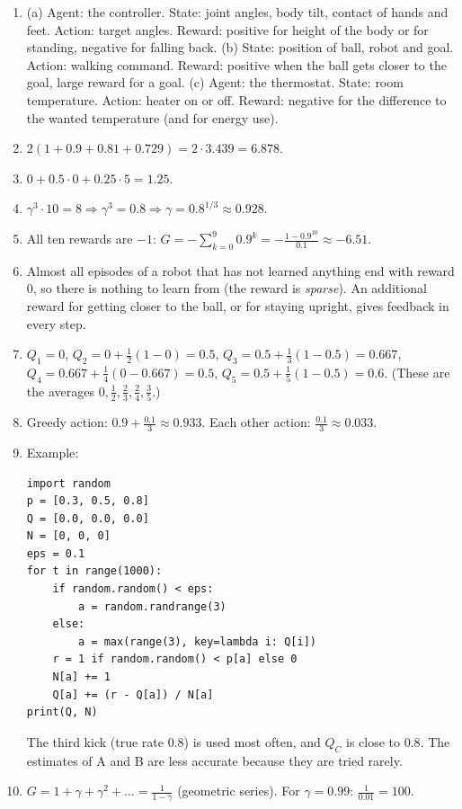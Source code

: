 \begin{enumerate}[label=\textbf{\ansnum.\arabic*}]
  \item (a) Agent: the controller. State: joint angles, body tilt, contact of hands and feet. Action: target angles. Reward: positive for height of the body or for standing, negative for falling back. (b) State: position of ball, robot and goal. Action: walking command. Reward: positive when the ball gets closer to the goal, large reward for a goal. (c) Agent: the thermostat. State: room temperature. Action: heater on or off. Reward: negative for the difference to the wanted temperature (and for energy use).
  \item $2(1+0.9+0.81+0.729)=2\cdot3.439=6.878$.
  \item $0+0.5\cdot0+0.25\cdot5=1.25$.
  \item $\gamma^3\cdot10=8\Rightarrow\gamma^3=0.8\Rightarrow\gamma=0.8^{1/3}\approx0.928$.
  \item All ten rewards are $-1$: $G=-\sum_{k=0}^{9}0.9^k=-\frac{1-0.9^{10}}{0.1}\approx-6.51$.
  \item Almost all episodes of a robot that has not learned anything end with reward $0$, so there is nothing to learn from (the reward is \emph{sparse}). An additional reward for getting closer to the ball, or for staying upright, gives feedback in every step.
  \item $Q_1=0$, $Q_2=0+\frac12(1-0)=0.5$, $Q_3=0.5+\frac13(1-0.5)=0.667$, $Q_4=0.667+\frac14(0-0.667)=0.5$, $Q_5=0.5+\frac15(1-0.5)=0.6$. (These are the averages $0,\frac12,\frac23,\frac24,\frac35$.)
  \item Greedy action: $0.9+\frac{0.1}{3}\approx0.933$. Each other action: $\frac{0.1}{3}\approx0.033$.
  \item Example:
\begin{verbatim}
import random
p = [0.3, 0.5, 0.8]
Q = [0.0, 0.0, 0.0]
N = [0, 0, 0]
eps = 0.1
for t in range(1000):
    if random.random() < eps:
        a = random.randrange(3)
    else:
        a = max(range(3), key=lambda i: Q[i])
    r = 1 if random.random() < p[a] else 0
    N[a] += 1
    Q[a] += (r - Q[a]) / N[a]
print(Q, N)
\end{verbatim}
  The third kick (true rate $0.8$) is used most often, and $Q_C$ is close to $0.8$. The estimates of A and B are less accurate because they are tried rarely.
  \item[\textbf{\ansnum.10}] $G=1+\gamma+\gamma^2+\dots=\frac{1}{1-\gamma}$ (geometric series). For $\gamma=0.99$: $\frac{1}{0.01}=100$.
\end{enumerate}
